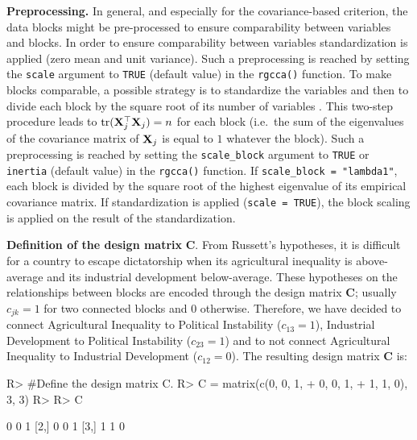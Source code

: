 \documentclass[
]{jss}
\begin{document}
\normalsize

\textbf{Preprocessing.} In general, and especially for the
covariance-based criterion, the data blocks might be pre-processed to
ensure comparability between variables and blocks. In order to ensure
comparability between variables standardization is applied (zero mean
and unit variance). Such a preprocessing is reached by setting the
\texttt{scale} argument to \texttt{TRUE} (default value) in the
\texttt{rgcca()} function. To make blocks comparable, a possible
strategy is to standardize the variables and then to divide each block
by the square root of its number of variables \citep{Westerhuis1998}.
This two-step procedure leads to \(\mathrm{tr}(\mathbf{X}_j^\top \mathbf{X}_j )=n\) for
each block (i.e.~the sum of the eigenvalues of the covariance matrix of
\(\mathbf{X}_j\) is equal to \(1\) whatever the block). Such a preprocessing is
reached by setting the \texttt{scale\_block} argument to \texttt{TRUE}
or \texttt{inertia} (default value) in the \texttt{rgcca()} function. If
\texttt{scale\_block\ =\ "lambda1"}, each block is divided by the square
root of the highest eigenvalue of its empirical covariance matrix. If
standardization is applied (\texttt{scale\ =\ TRUE}), the block scaling
is applied on the result of the standardization.

\textbf{Definition of the design matrix} \(\mathbf{C}\). From Russett's
hypotheses, it is difficult for a country to escape dictatorship when
its agricultural inequality is above-average and its industrial
development below-average. These hypotheses on the relationships between
blocks are encoded through the design matrix \(\mathbf{C}\); usually
\(c_{jk} = 1\) for two connected blocks and \(0\) otherwise. Therefore,
we have decided to connect Agricultural Inequality to Political
Instability (\(c_{13} = 1\)), Industrial Development to Political
Instability (\(c_{23} = 1\)) and to not connect Agricultural Inequality
to Industrial Development (\(c_{12} = 0\)). The resulting design matrix
\(\mathbf{C}\) is:

\footnotesize

\begin{CodeChunk}
\begin{CodeInput}
R> #Define the design matrix C.
R> C = matrix(c(0, 0, 1,
+              0, 0, 1,
+              1, 1, 0), 3, 3)
R> 
R> C
\end{CodeInput}
\begin{CodeOutput}
     [,1] [,2] [,3]
[1,]    0    0    1
[2,]    0    0    1
[3,]    1    1    0
\end{CodeOutput}
\end{CodeChunk}
\end{document}
